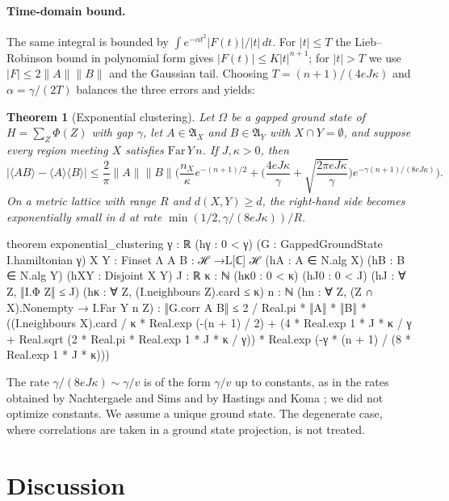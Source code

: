 \documentclass[11pt]{article}
\newtheorem{theorem}{Theorem}
\theoremstyle{definition}
\theoremstyle{remark}
\newcommand{\fA}{\mathfrak{A}}
\newcommand{\norm}[1]{\|#1\|}
\newcommand{\Far}{\mathrm{Far}}
\begin{document}
\paragraph{Time-domain bound.} The same integral is bounded by
$\int e^{-\alpha t^2}|F(t)|/|t|\,dt$. For $|t|\le T$ the Lieb--Robinson bound in polynomial form
gives $|F(t)|\le K|t|^{n+1}$; for $|t|>T$ we use $|F|\le2\norm A\norm B$ and the Gaussian tail.
Choosing $T=(n+1)/(4eJ\kappa)$ and $\alpha=\gamma/(2T)$ balances the three errors and yields:

\begin{theorem}[Exponential clustering]
Let $\Omega$ be a gapped ground state of $H=\sum_Z\Phi(Z)$ with gap $\gamma$, let $A\in\fA_X$ and
$B\in\fA_Y$ with $X\cap Y=\emptyset$, and suppose every region meeting $X$ satisfies
$\Far\,Y\,n$. If $J,\kappa>0$, then
\[
  |\langle AB\rangle-\langle A\rangle\langle B\rangle|\le\frac2\pi\norm A\norm B
  \Big(\frac{n_X}{\kappa}e^{-(n+1)/2}+\Big(\frac{4eJ\kappa}\gamma
  +\sqrt{\frac{2\pi eJ\kappa}\gamma}\Big)e^{-\gamma(n+1)/(8eJ\kappa)}\Big).
\]
On a metric lattice with range $R$ and $d(X,Y)\ge d$, the right-hand side becomes
exponentially small in $d$ at rate $\min(1/2,\gamma/(8eJ\kappa))/R$.
\end{theorem}

\begin{lean}
theorem exponential_clustering {γ : ℝ} (hγ : 0 < γ)
    (G : GappedGroundState I.hamiltonian γ) {X Y : Finset Λ} {A B : ℋ →L[ℂ] ℋ}
    (hA : A ∈ N.alg X) (hB : B ∈ N.alg Y) (hXY : Disjoint X Y) {J : ℝ} {κ : ℕ}
    (hκ0 : 0 < κ) (hJ0 : 0 < J) (hJ : ∀ Z, ‖I.Φ Z‖ ≤ J)
    (hκ : ∀ Z, (I.neighbours Z).card ≤ κ) {n : ℕ}
    (hn : ∀ Z, (Z ∩ X).Nonempty → I.Far Y n Z) :
    ‖G.corr A B‖ ≤ 2 / Real.pi * ‖A‖ * ‖B‖ *
      ((I.neighbours X).card / κ * Real.exp (-(n + 1) / 2) +
        (4 * Real.exp 1 * J * κ / γ + Real.sqrt (2 * Real.pi * Real.exp 1 * J * κ / γ)) *
          Real.exp (-γ * (n + 1) / (8 * Real.exp 1 * J * κ)))
\end{lean}

The rate $\gamma/(8eJ\kappa)\sim\gamma/v$ is of the form $\gamma/v$ up to constants, as in the
rates obtained by Nachtergaele and Sims and by Hastings and Koma
\cite{nachtergaelesims2006,hastingskoma2006}; we did not optimize constants. We assume a unique ground state. The degenerate case,
where correlations are taken in a ground state projection, is not treated.

\section{Discussion}\label{sec:discussion}
\end{document}
